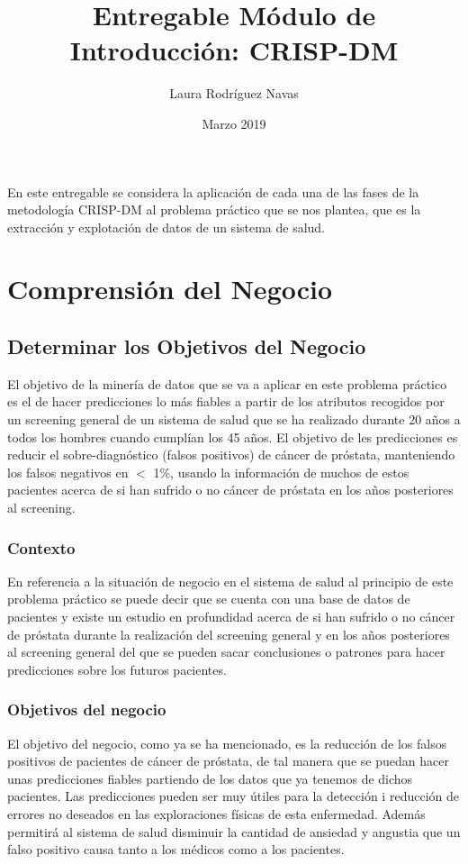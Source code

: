 \documentclass{article}
\title{Entregable Módulo de Introducción: CRISP-DM}
\author{Laura Rodríguez Navas}
\date{Marzo 2019}
\begin{document}
\maketitle

En este entregable se considera la aplicación de cada una de las fases de la metodología CRISP-DM al problema práctico que se nos plantea, que es la extracción y explotación de datos de un sistema de salud.

\section{Comprensión del Negocio}

\subsection{Determinar los Objetivos del Negocio}
El objetivo de la minería de datos que se va a aplicar en este problema práctico es el de hacer predicciones lo más fiables a partir de los atributos recogidos por un screening general de un sistema de salud que se ha realizado durante 20 años a todos los hombres cuando cumplían los 45 años. El objetivo de les predicciones es reducir el sobre-diagnóstico (falsos positivos) de cáncer de próstata, manteniendo los falsos negativos en $<$ 1\%, usando la información de muchos de estos pacientes acerca de si han sufrido o no cáncer de próstata en los años posteriores al screening.

\subsubsection{Contexto}
En referencia a la situación de negocio en el sistema de salud al principio de este problema práctico se puede decir que se cuenta con una base de datos de pacientes y existe un estudio en profundidad acerca de si han sufrido o no cáncer de próstata durante la realización del screening general y en los años posteriores al screening general del que se pueden sacar conclusiones o patrones para hacer predicciones sobre los futuros pacientes.

\subsubsection{Objetivos del negocio}
El objetivo del negocio, como ya se ha mencionado, es la reducción de los falsos positivos de pacientes de cáncer de próstata, de tal manera que se puedan hacer unas predicciones fiables partiendo de los datos que ya tenemos de dichos pacientes. Las predicciones pueden ser muy útiles para la detección i reducción de errores no deseados en las exploraciones físicas de esta enfermedad. Además permitirá al sistema de salud disminuir la cantidad de ansiedad y angustia que un falso positivo causa tanto a los médicos como a los pacientes.
	
\end{document}
